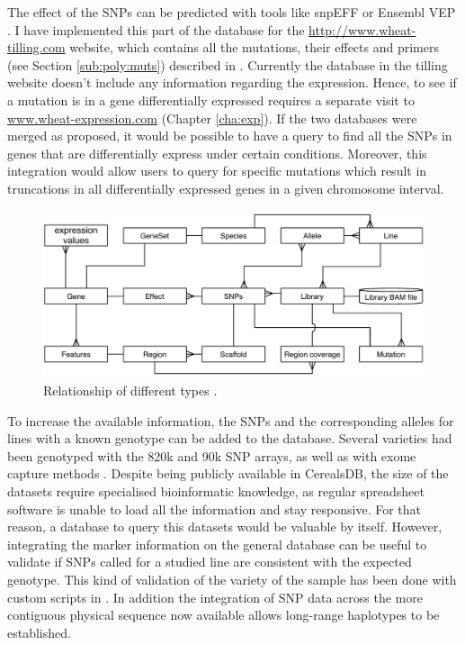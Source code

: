 The effect of the SNPs can be predicted with tools like snpEFF \citep{Cingolani2012} or Ensembl VEP \citep{Mclaren2016}. 
I have implemented this part of the database for the \url{http://www.wheat-tilling.com} website, which contains all the mutations, their effects and primers (see Section \ref{sub:poly:muts}) described in \citet{Krasileva2016}. 
Currently the database in the tilling website doesn't include any information regarding the expression. 
Hence, to see if a mutation is in a gene differentially expressed requires a separate visit to \url{www.wheat-expression.com} (Chapter \ref{cha:exp}). 
If the two databases were merged as proposed, it would be possible to have a query to find all the SNPs in genes that are differentially express under certain conditions.
Moreover, this integration would allow users to query for specific mutations which result in truncations in all differentially expressed genes in a given chromosome interval.  

\begin{figure}[b]
\includegraphics[width=1\textwidth]{Conclusions/Figures/IntegratingExperiments.pdf}
\caption{Relationship of different types .}
\label{fig:discussion:sequencingExperimentsTables}
\end{figure}

To increase the available information, the SNPs and the corresponding alleles for lines with a known genotype  can be added to the database. 
Several varieties had been genotyped with the 820k \citep{Winfield2016} and 90k \citep{Wang2014} SNP arrays, as well as with exome capture methods \citep{Jordan2015}.
Despite being publicly available in CerealsDB, the size of the datasets require specialised bioinformatic knowledge, as regular spreadsheet software is unable to load all the information and stay responsive. 
For that reason, a database to query this datasets would be valuable by itself. 
However, integrating the marker information on the general database can be useful to validate if SNPs called for a studied line are consistent with the expected genotype. 
This kind of validation of the variety of the sample has been done with custom scripts in \citep{Hubbard2015}.
In addition the integration of SNP data across the more contiguous physical sequence now available allows long-range haplotypes to be established. 

